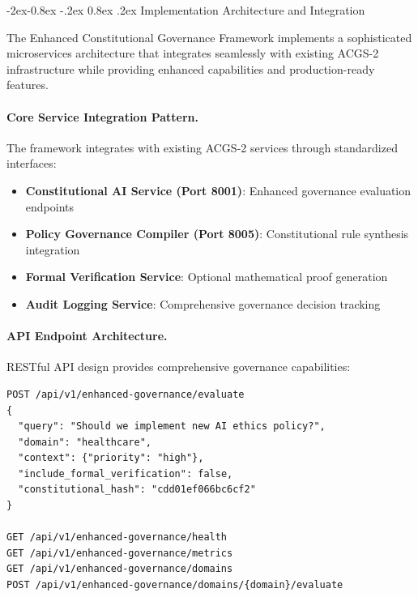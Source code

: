 \documentclass[manuscript,screen,9pt]{acmart}
\makeatletter
\renewcommand\subsubsection{\@startsection{subsubsection}{3}{\z@}%
  {-2ex\@plus -0.8ex \@minus -.2ex}%
  {0.8ex \@plus .2ex}%
  {\normalfont\normalsize\bfseries}}
\makeatother
\begin{document}
\subsubsection{Implementation Architecture and Integration}
\label{subsubsec:implementation_architecture}

The Enhanced Constitutional Governance Framework implements a sophisticated microservices architecture that integrates seamlessly with existing ACGS-2 infrastructure while providing enhanced capabilities and production-ready features.

\paragraph{Core Service Integration Pattern.}
The framework integrates with existing ACGS-2 services through standardized interfaces:

\begin{itemize}[itemsep=1pt,parsep=1pt]
    \item \textbf{Constitutional AI Service (Port 8001)}: Enhanced governance evaluation endpoints
    \item \textbf{Policy Governance Compiler (Port 8005)}: Constitutional rule synthesis integration
    \item \textbf{Formal Verification Service}: Optional mathematical proof generation
    \item \textbf{Audit Logging Service}: Comprehensive governance decision tracking
\end{itemize}

\paragraph{API Endpoint Architecture.}
RESTful API design provides comprehensive governance capabilities:

\begin{lstlisting}[caption=Enhanced Governance API Endpoints, label=lst:api_endpoints]
POST /api/v1/enhanced-governance/evaluate
{
  "query": "Should we implement new AI ethics policy?",
  "domain": "healthcare",
  "context": {"priority": "high"},
  "include_formal_verification": false,
  "constitutional_hash": "cdd01ef066bc6cf2"
}

GET /api/v1/enhanced-governance/health
GET /api/v1/enhanced-governance/metrics
GET /api/v1/enhanced-governance/domains
POST /api/v1/enhanced-governance/domains/{domain}/evaluate
\end{lstlisting}
\end{document}
